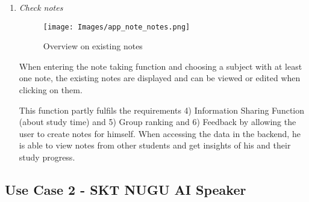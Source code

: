 \documentclass[conference]{IEEEtran}
\begin{document}
\begin{enumerate}
\begin{enumerate}
    \item \textit{Check notes}
    
            \begin{figure}[H]
    \centering
    \texttt{[image: Images/app\_note\_notes.png]}
    \caption{Overview on existing notes}
\end{figure}

When entering the note taking function and choosing a subject with at least one note, the existing notes are displayed and can be viewed or edited when clicking on them.

This function partly fulfils the requirements 4) Information Sharing Function (about study time) and 5) Group ranking and 6) Feedback by allowing the user to create notes for himself. When accessing the data in the backend, he is able to view notes from other students and get insights of his and their study progress.

    
\end{enumerate}

\end{enumerate}







\subsection{Use Case 2 - SKT NUGU AI Speaker}
\end{document}

